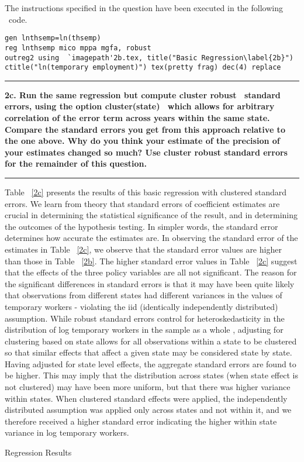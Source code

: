 \documentclass[12pt]{article}
\newcommand\question[1]{\vspace{1em}\hrule\vspace{1em}\textbf{#1}\vspace{1em}\hrule\vspace{1em}}
\begin{document}
The instructions specified in the question have been executed in the following \stata \  code.\\
\begin{lstlisting}
gen lnthsemp=ln(thsemp)
reg lnthsemp mico mppa mgfa, robust
outreg2 using  `imagepath'2b.tex, title("Basic Regression\label{2b}") ctitle("ln(temporary employment)") tex(pretty frag) dec(4) replace
\end{lstlisting}


\begin{table}
\caption{}

\end{table}

\newpage
\question{2c. Run the same regression but compute \textquotesingle cluster robust \textquotesingle \ standard errors, using the option \textquotesingle cluster(state) \textquotesingle \ which allows for arbitrary correlation of the error term across years within the same state. Compare the standard errors you get from this approach relative to the one above. Why do you think your estimate of the precision of your estimates changed so much? Use cluster robust standard errors for the remainder of this question.}


\noindent Table ~\ref{2c} presents the results of this basic regression with clustered standard errors. We learn from theory that standard errors of coefficient estimates are crucial in determining the statistical significance of the result, and in determining the outcomes of the hypothesis testing. In simpler words, the standard error determines how accurate the estimates are. In observing the standard error of the estimates in Table ~\ref{2c}, we observe that the standard error values are higher than those in Table ~\ref{2b}. The higher standard error values in Table ~\ref{2c} suggest that the effects of the three policy variables are all not significant. The reason for the significant differences in standard errors is that it may have been quite likely that observations from different states had different variances in the values of temporary workers - violating the iid  (identically independently distributed) assumption. While robust standard errors control for heteroskedasticity in the distribution of log temporary workers in the sample as a whole , adjusting for clustering based on state allows for all observations within a state to be clustered so that similar effects that affect a given state may be considered state by state. Having adjusted for state level effects, the aggregate standard errors are found to be higher. This may imply that the distribution across states (when state effect is not clustered) may have been more uniform, but that there was higher variance within states. When clustered standard effects were applied, the independently distributed assumption was applied only across states and not within it, and we therefore received a higher standard error indicating the higher within state variance in log temporary workers.
\begin{table}
\caption{Regression Results}

\end{table}
\end{document}
